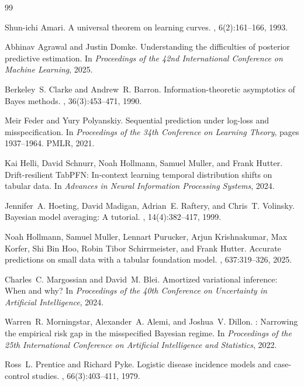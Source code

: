 \documentclass{article}
\theoremstyle{definition}
\theoremstyle{remark}
\begin{document}
\begin{thebibliography}{99}

Shun-ichi Amari.
\newblock A universal theorem on learning curves.
, 6(2):161--166, 1993.

Abhinav Agrawal and Justin Domke.
\newblock Understanding the difficulties of posterior predictive estimation.
\newblock In {\em Proceedings of the 42nd International Conference on Machine Learning}, 2025.

Berkeley~S. Clarke and Andrew~R. Barron.
\newblock Information-theoretic asymptotics of {B}ayes methods.
, 36(3):453--471, 1990.

Meir Feder and Yury Polyanskiy.
\newblock Sequential prediction under log-loss and misspecification.
\newblock In {\em Proceedings of the 34th Conference on Learning Theory}, pages 1937--1964. PMLR, 2021.

Kai Helli, David Schnurr, Noah Hollmann, Samuel Muller, and Frank Hutter.
\newblock Drift-resilient {T}ab{PFN}: In-context learning temporal distribution shifts on tabular data.
\newblock In {\em Advances in Neural Information Processing Systems}, 2024.

Jennifer~A. Hoeting, David Madigan, Adrian~E. Raftery, and Chris~T. Volinsky.
\newblock Bayesian model averaging: A tutorial.
, 14(4):382--417, 1999.

Noah Hollmann, Samuel Muller, Lennart Purucker, Arjun Krishnakumar, Max Korfer, Shi Bin Hoo, Robin Tibor Schirrmeister, and Frank Hutter.
\newblock Accurate predictions on small data with a tabular foundation model.
, 637:319--326, 2025.

Charles~C. Margossian and David~M. Blei.
\newblock Amortized variational inference: When and why?
\newblock In {\em Proceedings of the 40th Conference on Uncertainty in Artificial Intelligence}, 2024.

Warren~R. Morningstar, Alexander~A. Alemi, and Joshua~V. Dillon.
: Narrowing the empirical risk gap in the misspecified Bayesian regime.
\newblock In {\em Proceedings of the 25th International Conference on Artificial Intelligence and Statistics}, 2022.

Ross~L. Prentice and Richard Pyke.
\newblock Logistic disease incidence models and case-control studies.
, 66(3):403--411, 1979.


\end{thebibliography}
\end{document}
